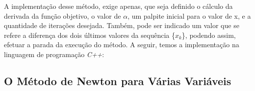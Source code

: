 \hspace{0.8cm}
A implementação desse método, exige apenas, que seja definido o cálculo
da derivada da função objetivo, o valor de $\alpha$, um palpite inicial para
o valor de x, e a quantidade de iterações desejada. Também, pode ser
indicado um valor que se refere a diferença dos dois últimos valores
da sequência \{$x_k$\}, podendo assim, efetuar a parada da execução do
método. A seguir, temos a implementação na linguagem de programação
\textit{C++}:

\vspace{0.2cm}





\textcolor[rgb]{1,0,0}{\section{{O Método de Newton para Várias Variáveis}}}
